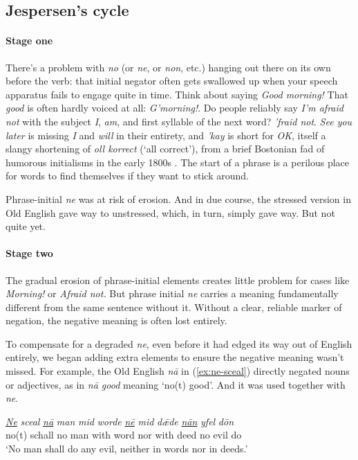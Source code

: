 \subsection{Jespersen's cycle}

\paragraph*{Stage one}
There's a problem with \textit{no} (or \textit{ne}, or \textit{non}, etc.) hanging out there on its own before the verb: that initial negator often gets swallowed up when your speech apparatus fails to engage quite in time. Think about saying \textit{Good morning!} That \textit{good} is often hardly voiced at all: \textit{G'morning!}. Do people reliably say \textit{I'm afraid not} with the subject \textit{I}, \textit{am}, and first syllable of the next word? \textit{'fraid not}. \textit{See you later} is missing \textit{I} and \textit{will} in their entirety, and \textit{'kay} is short for \textit{OK}, itself a slangy shortening of \textit{oll korrect} (`all correct'), from a brief Bostonian fad of humorous initialisms in the early 1800s \citep{OK}. The start of a phrase is a perilous place for words to find themselves if they want to stick around.

Phrase-initial \textit{ne} was at risk of erosion. And in due course, the stressed version in Old English gave way to unstressed, which, in turn, simply gave way. But not quite yet.

\paragraph*{Stage two}

The gradual erosion of phrase-initial elements creates little problem for cases like \textit{Morning!} or \textit{Afraid not.} But phrase initial \textit{ne} carries a meaning fundamentally different from the same sentence without it. Without a clear, reliable marker of negation, the negative meaning is often lost entirely.

To compensate for a degraded \textit{ne}, even before it had edged its way out of English entirely, we began adding extra elements to ensure the negative meaning wasn't missed. For example, the Old English \textit{nā} in (\ref{ex:ne-sceal}) directly negated nouns or adjectives, as in \textit{nā good} meaning `no(t) good'. And it was used together with \textit{ne}.

\ea \label{ex:ne-sceal}
    \gll \uline{\textit{Ne}} \textit{sceal} \uline{\textit{nā}} \textit{man} \textit{mid} \textit{worde} \uline{\textit{nē}} \textit{mid} \textit{dǣde} \uline{\textit{nān}} \textit{yfel} \textit{dōn}  \\ no(t) schall no man with word nor with deed no evil do \\
    \trans `No man shall do any evil, neither in words nor in deeds.'
\z

